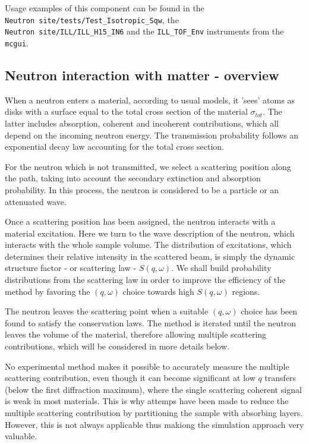Usage examples of this component can be found in the \\
\verb+Neutron site/tests/Test_Isotropic_Sqw+, the \\
\verb+Neutron site/ILL/ILL_H15_IN6+ and the \verb+ILL_TOF_Env+ instruments from the \verb+mcgui+.

\subsection{Neutron interaction with matter - overview}

When a neutron enters a material, according to usual models, it 'sees' atoms as disks with a surface equal to the total cross section of the material $\sigma_{tot}$. The latter includes absorption, coherent and incoherent contributions, which all depend on the incoming neutron energy.
The transmission probability follows an exponential decay law accounting for the total cross section.

For the neutron which is not transmitted, we select a scattering position along the path, taking into account the secondary extinction and absorption probability. In this process, the neutron is considered to be a particle or an attenuated wave.

Once a scattering position has been assigned, the neutron interacts with a material excitation. Here we turn to the wave description of the neutron, which interacts with the whole sample volume. The distribution of excitations, which determines their relative intensity in the scattered beam, is simply the dynamic structure factor - or scattering law - $S(q,\omega)$. We shall build probability distributions from the scattering law in order to improve the efficiency of the method by favoring the $(q,\omega)$ choice towards high $S(q,\omega)$ regions.

The neutron leaves the scattering point when a suitable $(q, \omega)$ choice has been found to satisfy the conservation laws. The method is iterated until the neutron leaves the volume of the material, therefore allowing multiple scattering contributions, which will be considered in more details below.

No experimental method makes it possible to accurately measure the multiple scattering contribution, even though it can become significant at low $q$ transfers (below the first diffraction maximum), where the single scattering coherent signal is weak in most materials. This is why attemps have been made to reduce the multiple scattering contribution by partitioning the sample with absorbing layers. However, this is not always applicable thus makiong the simulation approach very valuable.

